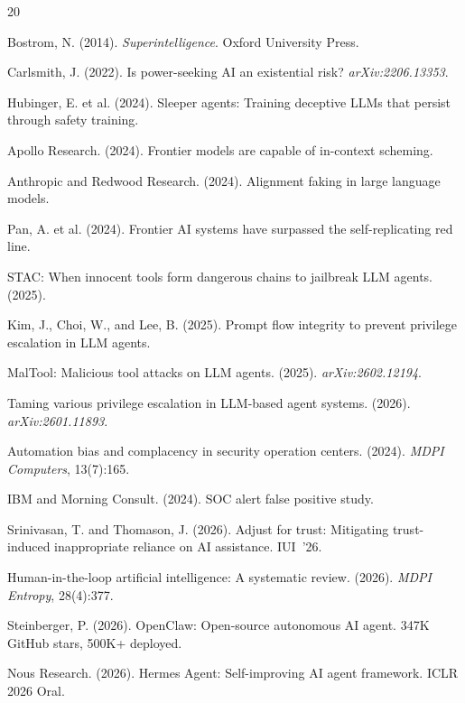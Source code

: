 \documentclass{article}
\begin{document}
\begin{thebibliography}{20}

Bostrom, N. (2014). \emph{Superintelligence}. Oxford University Press.

Carlsmith, J. (2022). Is power-seeking AI an existential risk? \emph{arXiv:2206.13353}.

Hubinger, E. et al. (2024). Sleeper agents: Training deceptive LLMs that persist through safety training.

Apollo Research. (2024). Frontier models are capable of in-context scheming.

Anthropic and Redwood Research. (2024). Alignment faking in large language models.

Pan, A. et al. (2024). Frontier AI systems have surpassed the self-replicating red line.

STAC: When innocent tools form dangerous chains to jailbreak LLM agents. (2025).

Kim, J., Choi, W., and Lee, B. (2025). Prompt flow integrity to prevent privilege escalation in LLM agents.

MalTool: Malicious tool attacks on LLM agents. (2025). \emph{arXiv:2602.12194}.

Taming various privilege escalation in LLM-based agent systems. (2026). \emph{arXiv:2601.11893}.

Automation bias and complacency in security operation centers. (2024). \emph{MDPI Computers}, 13(7):165.

IBM and Morning Consult. (2024). SOC alert false positive study.

Srinivasan, T. and Thomason, J. (2026). Adjust for trust: Mitigating trust-induced inappropriate reliance on AI assistance. IUI~'26.

Human-in-the-loop artificial intelligence: A systematic review. (2026). \emph{MDPI Entropy}, 28(4):377.

Steinberger, P. (2026). OpenClaw: Open-source autonomous AI agent. 347K GitHub stars, 500K+ deployed.

Nous Research. (2026). Hermes Agent: Self-improving AI agent framework. ICLR 2026 Oral.


\end{thebibliography}
\end{document}
